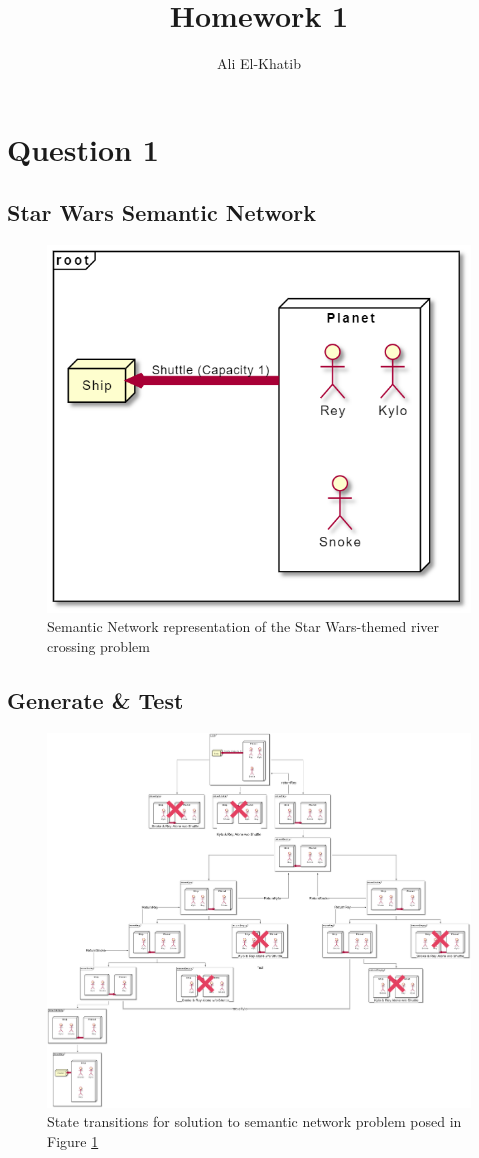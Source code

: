 \documentclass[
	letterpaper, %
]{jdf}
\author{Ali El-Khatib}
\title{Homework 1}
\begin{document}
\maketitle
\section{Question 1}
\subsection{Star Wars Semantic Network}
\begin{figure}[H]
	\centering
	\includegraphics[width=0.7\linewidth]{../figures/starwars-semantic-network}
	\caption{Semantic Network representation of the Star Wars-themed river crossing problem}
	\label{fig:starwars-semantic-network}
\end{figure}
\pagebreak
\subsection{Generate \& Test}
\begin{figure}[hbtp]
	\centering
	\includegraphics[height=\textheight]{../figures/semantic-network-Page-1.drawio}
	\caption{State transitions for solution to semantic network problem posed in  Figure \ref{fig:starwars-semantic-network}}
	\label{fig:semantic-network-page-1}
\end{figure}
\pagebreak
\end{document}
